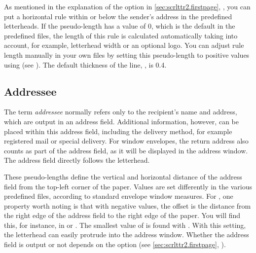 \begin{Declaration}
\end{Declaration}
As mentioned in the explanation of the
 option in
\autoref{sec:scrlttr2.firstpage}, , you
can put a horizontal rule within or below the sender's address in the
predefined letterheads. If the 
pseudo-length has a value of 0, which is the default in the
predefined  files, the length of this rule is calculated
automatically taking into account, for example, letterhead width or an
optional logo. You can adjust rule length manually in your own 
files by setting this pseudo-length to positive values using
 (see ). The
default thickness of the line,
, is 0.4.%
\EndIndexGroup
%
\EndIndexGroup


\subsection{Addressee}
%
\BeginIndexGroup
{}

The term \emph{addressee} normally refers only to the recipient's name and
address, which are output in an address field. Additional information,
however, can be placed within this address field, including the delivery
method, for example registered mail or special delivery. For window envelopes,
the return address also counts as part of the address field, as it will be
displayed in the address window. The address field directly follows the
letterhead.

\begin{Declaration}
\end{Declaration}
These pseudo-lengths define the vertical and horizontal distance of the
address field from the top-left corner of the paper. Values are set
differently in the various predefined  files, according to standard envelope window
measures. For , one property worth noting is that with
negative values, the offset is the distance from the right edge of the address
field to the right edge of the paper. You will find this, for instance, in
 or . The smallest value of  is
found with . With this setting, the letterhead can easily
protrude into the address window. Whether the address field is output or not
depends on the  option (see
\autoref{sec:scrlttr2.firstpage}, ).%
\EndIndexGroup


